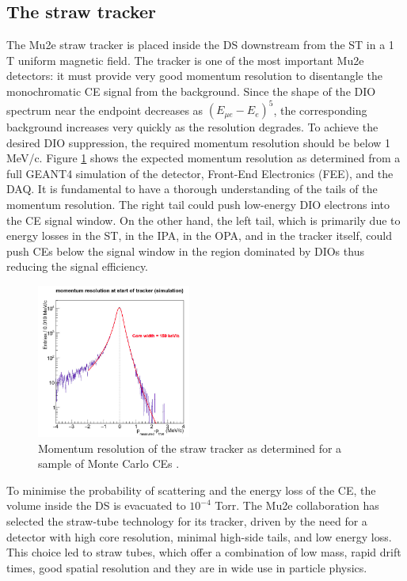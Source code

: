 \subsection{The straw tracker}\label{trackersec}
The Mu2e straw tracker is placed inside the DS downstream from 
the ST in a 1 T uniform magnetic field. The tracker is one of the most 
important Mu2e detectors: it must provide very good momentum resolution to 
disentangle the monochromatic CE signal from the background. 
Since the shape of the DIO spectrum near the endpoint decreases as 
$(E_{\mu e} -E_e)^5$, the corresponding background increases very quickly as the resolution
degrades. To achieve the desired DIO suppression, the required momentum resolution should be below 1 MeV/c.  
Figure \ref{fig:trkres} shows the expected momentum resolution as determined 
from a full GEANT4 simulation of the detector, Front-End Electronics (FEE), and the DAQ.
It is fundamental to have a thorough understanding of the tails of the momentum resolution. 
The right tail could push low-energy DIO electrons into the CE signal window. 
On the other hand, the left tail, which is primarily due to energy losses in the ST, 
in the IPA, in the OPA, and in the tracker itself, could 
push CEs below the signal window in the region dominated by DIOs 
thus reducing the signal efficiency.
\begin{figure}[!h]
    \centering
    \includegraphics[width =0.45\textwidth]{figures/png/Screenshot_20240330_104830.png}
    \caption[The momentum resolution of the straw tracker.]{Momentum resolution of the straw tracker as determined for 
    a sample of Monte Carlo CEs \cite{bobbb}.}
    \label{fig:trkres}
    \end{figure} 
To minimise the probability of scattering and the energy loss of the CE, 
the volume inside the DS is evacuated to $10^{-4}$ Torr. 
The Mu2e collaboration has selected the straw-tube 
technology \cite{bobbb} for its tracker, driven by the need for 
a detector with high core resolution, minimal high-side tails, 
and low energy loss. This choice led to straw tubes, which 
offer a combination of low mass, rapid drift times, good spatial 
resolution and they are in wide use in particle physics. 

